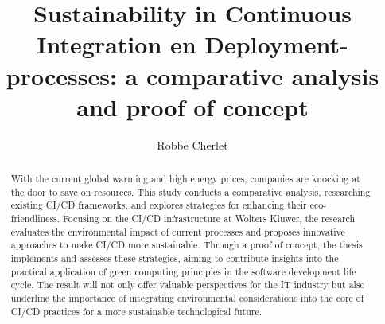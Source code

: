 \documentclass{hogent-article}
\title{Sustainability in Continuous Integration en Deployment-processes: a comparative analysis and proof of concept}
\author{Robbe Cherlet}
\begin{document}
\begin{abstract}
With the current global warming and high energy prices, companies are knocking at the door to save on resources. This study conducts a comparative analysis, researching existing CI/CD frameworks, and explores strategies for enhancing their eco-friendliness. Focusing on the CI/CD infrastructure at Wolters Kluwer, the research evaluates the environmental impact of current processes and proposes innovative approaches to make CI/CD more sustainable. Through a proof of concept, the thesis implements and assesses these strategies, aiming to contribute insights into the practical application of green computing principles in the software development life cycle. The result will not only offer valuable perspectives for the IT industry but also underline the importance of integrating environmental considerations into the core of CI/CD practices for a more sustainable technological future.
  
\end{abstract}

\tableofcontents



\printbibliography[heading=bibintoc]
\end{document}
